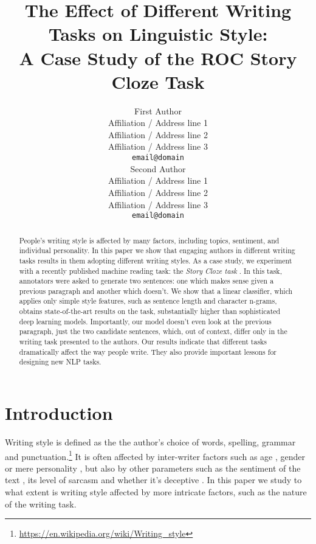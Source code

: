 \documentclass[11pt,a4paper]{article}
\title{The Effect of Different Writing Tasks on Linguistic Style:\\ A Case Study of the ROC Story Cloze Task}
\author{First Author \\
  Affiliation / Address line 1 \\
  Affiliation / Address line 2 \\
  Affiliation / Address line 3 \\
  {\tt email@domain} \\\And
  Second Author \\
  Affiliation / Address line 1 \\
  Affiliation / Address line 2 \\
  Affiliation / Address line 3 \\
  {\tt email@domain} \\}
\date{}
\begin{document}
\maketitle
\begin{abstract}
People's writing style is affected by many factors, including topics, sentiment, and individual personality. 
In this paper we show that engaging authors in different  writing tasks results in them adopting different writing styles.
As a case study, we experiment with a recently published machine reading task: the {\it Story Cloze task} \cite{Mostafazadeh:2016}. 
In this task, annotators were asked to generate two sentences: one which makes sense given a previous paragraph and another which doesn't.
We show that a linear classifier, which applies only simple style features, such as sentence length and character n-grams, obtains state-of-the-art results on the task,
substantially higher than sophisticated deep learning models.
Importantly, our model doesn't even look at the previous paragraph, just the two candidate sentences, which, out of context, differ only in the writing task presented to the authors. 
Our results indicate that different tasks dramatically affect the way people write. 
They also provide important lessons for designing new NLP tasks.

\end{abstract}

\section{Introduction}
Writing style is defined as the the author's choice of words, spelling, grammar and punctuation.\footnote{\url{https://en.wikipedia.org/wiki/Writing_style}}
It is often affected by inter-writer factors such as age \cite{Schler:2006}, gender \cite{Argamon:2003} or mere personality \cite{Stamatatos:2009}, but also by other parameters such as the sentiment of the text \cite{Davidov:2010}, its level of sarcasm \cite{Tsur:2010} and whether it's deceptive \cite{Feng:2012}.  
In this paper we study to what extent is writing style affected by more intricate factors, such as the nature of the writing task. 
\end{document}
